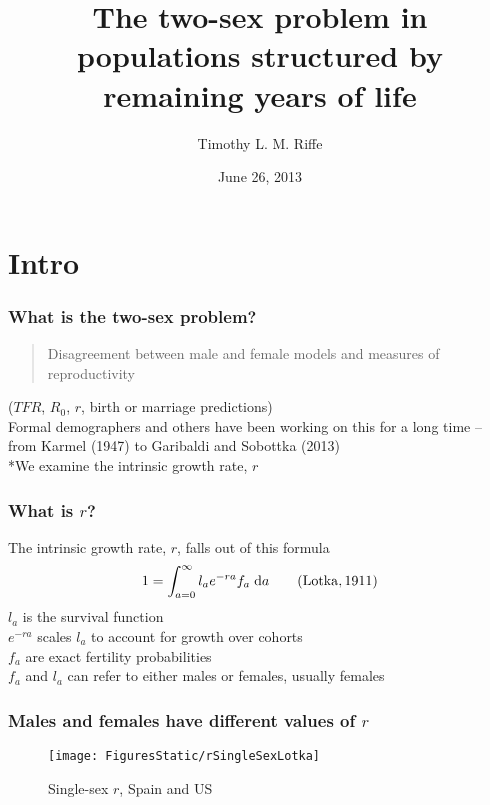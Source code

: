 \documentclass{beamer}
\title[2-sex problem and remaining years structure]{The two-sex problem in
populations structured by remaining years of life}
\author[Tim Riffe]{Timothy L. M. Riffe}
\institute[UAB]{Director: Dr. Albert Esteve Pal\'{o}s \\
\vspace{2em}
Universitat Aut\`{o}noma de Barcelona \\ 
Centre d'Estudis Demogr\`{a}fics }
\date{June 26, 2013}
\newcommand{\dd}{\; \mathrm{d}}
\begin{document}

\begin{frame}
  \titlepage
\end{frame}

\section{Intro}
\begin{frame}
  \frametitle{What is the two-sex problem?}
  \begin{quotation}
  \noindent Disagreement between male and female models and measures of
  reproductivity  \end{quotation}
  ($TFR$, $R_0$, $r$, birth or marriage predictions) \\
   \vspace{2em}
   Formal demographers and others have been working on this for a
  long time -- from Karmel (1947) to Garibaldi and Sobottka (2013)\\
  \vspace{2em}
   *We examine the intrinsic growth rate, $r$
\end{frame}


\begin{frame}
  \frametitle{What is $r$?}
   The intrinsic growth rate, $r$, falls out of this formula
  \begin{equation}
  1 = \int _{a=0}^\infty l_ae^{-ra}f_a \dd a \notag \quad \quad
  \mathrm{(Lotka, 1911)}
  \end{equation}
   $l_a$ is the survival function \\
   $e^{-ra}$ scales $l_a$ to account for growth over cohorts \\
   $f_a$ are exact fertility probabilities \\
   $f_a$ and $l_a$ can refer to either males or females, usually
  females
\end{frame}


\begin{frame}
  \frametitle{Males and females have different values of $r$}
  \vspace{-2em}
  \begin{figure}
  \centering
  \caption*{Single-sex $r$, Spain and US}
  \texttt{[image: FiguresStatic/rSingleSexLotka]}
\end{figure}
\end{frame}
\end{document}
